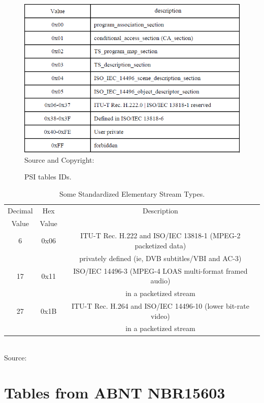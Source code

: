\documentclass[
	12pt,				%
	openright,			%
	twoside,			%
	a4paper,			%
	brazil,
	french,				%
	english
	]{abntex2}
\begin{document}
\begin{anexosenv}
\begin{figure}[!hb]
\centering
\caption{PSI tables IDs.}
\includegraphics[width=0.7\linewidth]{figuras/tab_psi_tables_ids.png}
\\Source and Copyright: 
\label{fig:tab_psi_tables_ids}
\end{figure}

\begin{table}[!htpd]
\caption{Some Standardized Elementary Stream Types.}
\begin{center}
\begin{tabular}{|c|c|c|}
\hline
Decimal & Hex & Description \\
Value & Value & \\
\hline
6 & 0x06 & ITU-T Rec. H.222 and ISO/IEC 13818-1 (MPEG-2 packetized data)\\
 & & privately defined (ie, DVB subtitles/VBI and AC-3)\\
 \hline
17 & 0x11 & ISO/IEC 14496-3 (MPEG-4 LOAS multi-format framed audio)\\
 & & in a packetized stream \\
 \hline
27 & 0x1B & ITU-T Rec. H.264 and ISO/IEC 14496-10 (lower bit-rate video)\\
 & & in a packetized stream \\
\hline
\end{tabular}
\label{tab_ISOESTypes}
\\Source: \cite[2.4.4.9]{ISO}
\end{center}
\end{table}


\chapter{Tables from ABNT NBR15603}
\label{tables_abnt}


\end{anexosenv}
\end{document}
